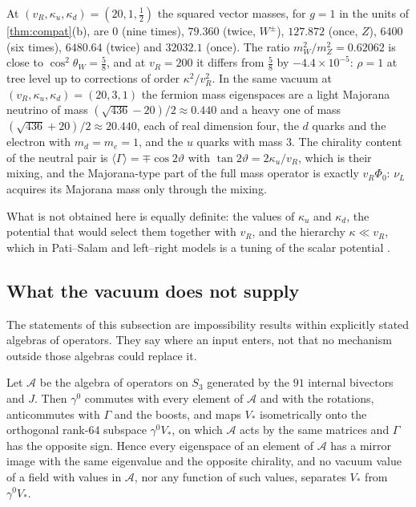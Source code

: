 \begin{example}
\label{ex:EWspectrum}
At $(v_R,\kappa_u,\kappa_d)=(20,1,\tfrac12)$ the squared vector masses, for $g=1$ in the units of \cref{thm:compat}(b), are $0$ (nine times), $79.360$ (twice, $W^\pm$),
$127.872$ (once, $Z$), $6400$ (six times), $6480.64$ (twice) and $32032.1$ (once). The ratio $m_W^2/m_Z^2=0.62062$ is close to $\cos^2\theta_W=\tfrac58$, and at
$v_R=200$ it differs from $\tfrac58$ by $-4.4\times10^{-5}$: $\rho=1$ at tree level up to corrections of order $\kappa^2/v_R^2$. In the same vacuum at
$(v_R,\kappa_u,\kappa_d)=(20,3,1)$ the fermion mass eigenspaces are a light Majorana neutrino of mass $(\sqrt{436}-20)/2\approx0.440$ and a heavy one of mass
$(\sqrt{436}+20)/2\approx20.440$, each of real dimension four, the $d$ quarks and the electron with $m_d=m_e=1$, and the $u$ quarks with mass $3$. The
chirality content of the neutral pair is $\langle\Gamma\rangle=\mp\cos2\vartheta$ with $\tan2\vartheta=2\kappa_u/v_R$, which is their mixing, and the Majorana-type part of the full
mass operator is exactly $v_R\Phi_0$: $\nu_L$ acquires its Majorana mass only through the mixing.
\end{example}

What is not obtained here is equally definite: the values of $\kappa_u$ and $\kappa_d$, the potential that would select them together with $v_R$, and the
hierarchy $\kappa\ll v_R$, which in Pati--Salam and left--right models is a tuning of the scalar potential \cite{Gildener76}.

\subsection{What the vacuum does not supply}

The statements of this subsection are impossibility results within explicitly stated algebras of operators. They say where an input enters, not that no
mechanism outside those algebras could replace it.

\begin{proposition}
\label{prop:mirror}
Let $\mathcal A$ be the algebra of operators on $S_3$ generated by the $91$ internal bivectors and $J$. Then $\gamma^0$ commutes with every element of $\mathcal A$ and
with the rotations, anticommutes with $\Gamma$ and the boosts, and maps $V_*$ isometrically onto the orthogonal rank-$64$ subspace $\gamma^0V_*$, on which $\mathcal A$
acts by the same matrices and $\Gamma$ has the opposite sign. Hence every eigenspace of an element of $\mathcal A$ has a mirror image with the same eigenvalue and the
opposite chirality, and no vacuum value of a field with values in $\mathcal A$, nor any function of such values, separates $V_*$ from $\gamma^0V_*$.
\end{proposition}

